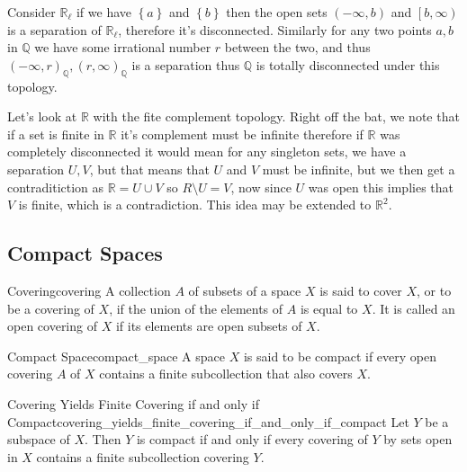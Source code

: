 





Consider $ \mathbb{R} _{ \ell } $ if we have $ \left\{ a \right\}  $ and $ \left\{ b \right\}  $ then the open sets $ \left( - \infty , b \right) $ and $ \left[ b, \infty  \right) $ is a separation of $ \mathbb{R} _{ \ell }  $, therefore it's disconnected. Similarly for any two points $ a, b $  in $ \mathbb{Q}  $ we have some irrational number $ r $ between the two, and thus $ \left( - \infty , r \right) _{ \mathbb{Q}  } , \left( r, \infty  \right) _{ \mathbb{Q}  }  $ is a separation thus $ \mathbb{Q}  $ is totally disconnected under this topology. 

Let's look at $ \mathbb{R}  $ with the fite complement topology. Right off the bat, we note that if a set is finite in $ \mathbb{R}  $ it's complement must be infinite therefore if $ \mathbb{R}  $ was completely disconnected it would mean for any singleton sets, we have a separation $ U, V $, but that means that $ U $ and $ V $ must be infinite, but we then get a contraditiction as $ \mathbb{R} =  U \cup V $ so $ R \setminus U = V $, now since $ U $ was open this implies that $ V $ is finite, which is a contradiction. This idea may be extended to $ \mathbb{R} ^{ 2 }  $.


\subsection{Compact Spaces}

\begin{definition}{Covering}{covering}
A collection $A$ of subsets of a space $X$ is said to cover $X$, or to be a covering of $X$, if the union of the elements of $A$ is equal to $X$. It is called an open covering of $X$ if its elements are open subsets of $X$.
\end{definition}

\begin{definition}{Compact Space}{compact_space}
A space $X$ is said to be compact if every open covering $A$ of $X$ contains a finite subcollection that also covers $X$.
\end{definition}

\begin{lemma}{Covering Yields Finite Covering if and only if Compact}{covering_yields_finite_covering_if_and_only_if_compact}
Let $Y$ be a subspace of $X$. Then $Y$ is compact if and only if every covering of $Y$ by sets open in $X$ contains a finite subcollection covering $Y$.
\end{lemma}
